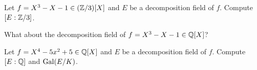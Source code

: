 \begin{exercise}
    Let $f=X^3-X-1\in (\mathbb{Z}/3)[X]$ and $E$ be a decomposition field of $f$. 
    Compute $[E:\mathbb{Z}/3]$. 
\end{exercise}

What about the decomposition field of $f=X^3-X-1\in \mathbb{Q}[X]$?

\begin{exercise}
    Let $f=X^4-5x^2+5\in \mathbb{Q}[X]$ and $E$ be a decomposition field of $f$. 
    Compute $[E:\mathbb{Q}]$ and $\operatorname{Gal}(E/K)$. 
\end{exercise}



